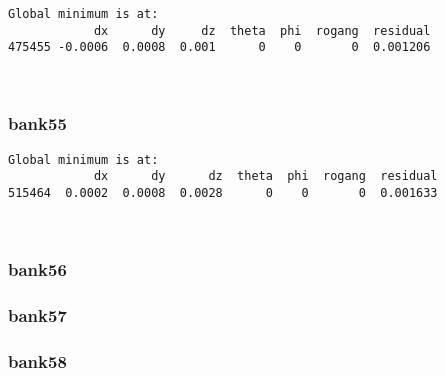 \documentclass[11pt]{article}
\begin{document}
    \begin{Verbatim}[commandchars=\\\{\}]
Global minimum is at:
            dx      dy     dz  theta  phi  rogang  residual
475455 -0.0006  0.0008  0.001      0    0       0  0.001206
    \end{Verbatim}

    \begin{center}
    \end{center}
    { \hspace*{\fill} \\}
    
    \hypertarget{bank55}{%
\subsubsection{bank55}\label{bank55}}

    \begin{Verbatim}[commandchars=\\\{\}]
Global minimum is at:
            dx      dy      dz  theta  phi  rogang  residual
515464  0.0002  0.0008  0.0028      0    0       0  0.001633
    \end{Verbatim}

    \begin{center}
    \end{center}
    { \hspace*{\fill} \\}
    
    \hypertarget{bank56}{%
\subsubsection{bank56}\label{bank56}}

    \hypertarget{bank57}{%
\subsubsection{bank57}\label{bank57}}

    \hypertarget{bank58}{%
\subsubsection{bank58}\label{bank58}}
\end{document}
